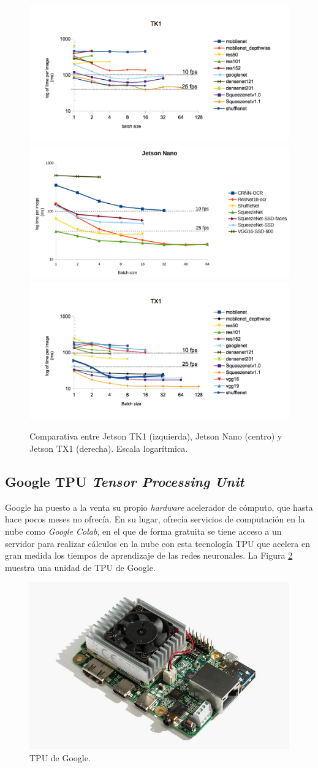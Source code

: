 \begin{figure}[htp]
    \centering
    \captionsetup{justification=centering}
    \includegraphics[width=.33\textwidth]{img/TK1_log.png}\hfill
    \includegraphics[width=.33\textwidth]{img/Jetson-nano-log.png}\hfill
    \includegraphics[width=.33\textwidth]{img/TX1_log.png}
    \caption{Comparativa entre Jetson TK1 (izquierda), Jetson Nano (centro) y Jetson TX1 (derecha). Escala logarítmica.}
    \label{fig:ben_nano_comp}
\end{figure}

\subsection{Google TPU \textit{Tensor Processing Unit}}

Google ha puesto a la venta su propio \textit{hardware} acelerador de cómputo, que hasta hace pocos meses no ofrecía. En su lugar, ofrecía servicios de computación en la nube como \textit{Google Colab}, en el que de forma gratuita se tiene acceso a un servidor para realizar cálculos en la nube con esta tecnología TPU que acelera en gran medida los tiempos de aprendizaje de las redes neuronales. La Figura \ref{fig:tpu} muestra una unidad de TPU de Google.

\begin{figure}[htp]
    \centering
    \captionsetup{justification=centering}
    \includegraphics[width=.5\textwidth]{img/tpu.PNG}\hfill
    \caption{TPU de Google.}
    \label{fig:tpu}
\end{figure}

